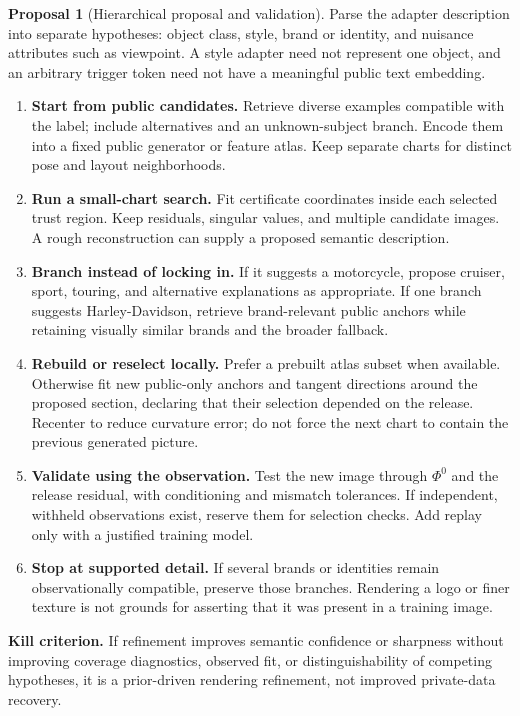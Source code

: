 \documentclass[11pt,a4paper]{article}
\theoremstyle{definition}
\theoremstyle{definition}
\newtheorem{proposal}[theorem]{Proposal}
\theoremstyle{remark}\newtheorem{remark}[theorem]{Remark}
\begin{document}
\begin{proposal}[Hierarchical proposal and validation]\label{pr:hierarchy}
Parse the adapter description into separate hypotheses: object class, style, brand or identity, and nuisance attributes such as viewpoint. A style adapter need not represent one object, and an arbitrary trigger token need not have a meaningful public text embedding.

\begin{enumerate}
\item \textbf{Start from public candidates.} Retrieve diverse examples compatible with the label; include alternatives and an unknown-subject branch. Encode them into a fixed public generator or feature atlas. Keep separate charts for distinct pose and layout neighborhoods.
\item \textbf{Run a small-chart search.} Fit certificate coordinates inside each selected trust region. Keep residuals, singular values, and multiple candidate images. A rough reconstruction can supply a proposed semantic description.
\item \textbf{Branch instead of locking in.} If it suggests a motorcycle, propose cruiser, sport, touring, and alternative explanations as appropriate. If one branch suggests Harley-Davidson, retrieve brand-relevant public anchors while retaining visually similar brands and the broader fallback.
\item \textbf{Rebuild or reselect locally.} Prefer a prebuilt atlas subset when available. Otherwise fit new public-only anchors and tangent directions around the proposed section, declaring that their selection depended on the release. Recenter to reduce curvature error; do not force the next chart to contain the previous generated picture.
\item \textbf{Validate using the observation.} Test the new image through $\Phi^0$ and the release residual, with conditioning and mismatch tolerances. If independent, withheld observations exist, reserve them for selection checks. Add replay only with a justified training model.
\item \textbf{Stop at supported detail.} If several brands or identities remain observationally compatible, preserve those branches. Rendering a logo or finer texture is not grounds for asserting that it was present in a training image.
\end{enumerate}
\textbf{Kill criterion.} If refinement improves semantic confidence or sharpness without improving coverage diagnostics, observed fit, or distinguishability of competing hypotheses, it is a prior-driven rendering refinement, not improved private-data recovery.
\end{proposal}
\end{document}
